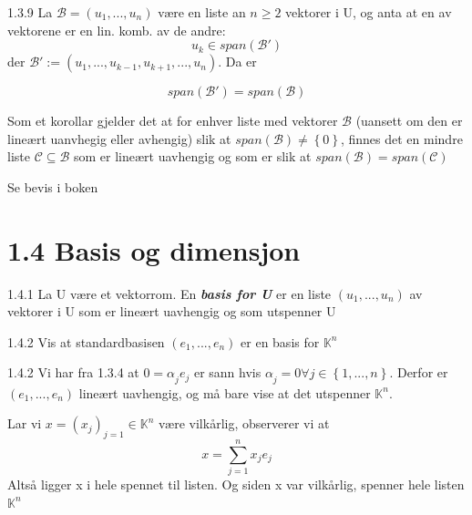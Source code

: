 \documentclass[a4paper,norsk]{article}
\renewcommand{\geq}{\geqslant}
\begin{document}
\begin{propositionbox}{1.3.9}{}
La $ \mathcal{B}= \left( u_1, ..., u_n \right)  $ være en liste an $  n \geq 2 $ vektorer i U, og anta at en av vektorene er en lin. komb. av de andre: 
\[
    u_k \in span \left( \mathcal{B}' \right) 
\]
der $ \mathcal{B}' := \left( u_1, ..., u_{k-1}, u_{k+1}, ..., u_n \right)  $. Da er

\[
    span \left( \mathcal{B}' \right) = span \left( \mathcal{B} \right) 
\]

Som et korollar gjelder det at for enhver liste med vektorer $ \mathcal{B} $  (uansett om den er lineært uanvhegig eller avhengig) slik at $ span \left( \mathcal{B} \right) \neq \left\{ 0 \right\}   $, finnes det en mindre liste $ \mathcal{C} \subseteq \mathcal{B} $ som er lineært uavhengig og som er slik at $ span \left( \mathcal{B} \right) = span \left( \mathcal{C} \right)   $ 

Se bevis i boken
\end{propositionbox}

\section*{1.4 Basis og dimensjon}

\begin{definitionbox}{1.4.1}{}
La U være et vektorrom. En \textbf{\textit{basis for U}} er en liste $ \left(  u_1, ..., u_n  \right)  $  av vektorer i U som er lineært uavhengig og som utspenner U
\end{definitionbox}


\begin{oppgavebox}{1.4.2}{}
Vis at standardbasisen $ \left( e_1, ..., e_n \right)  $ er en basis for $ \mathbb{K}^n $ 

\begin{proofbox}{1.4.2}{}
Vi har fra 1.3.4 at $ 0 = \alpha_{j}^{} e_j $ er sann hvis $ \alpha_{j}^{} = 0 \forall j \in \left\{ 1, ..., n \right\}  $. Derfor er $ \left( e_1, ..., e_n \right)  $ lineært uavhengig, og må bare vise at det utspenner $ \mathbb{K}^n $. 

Lar vi $ x = \left( x_j \right)_{j=1} \in \mathbb{K}^n  $ være vilkårlig, observerer vi at 
\[
    x = \sum_{ j=1 }^{ n } x_j e_j
\]
Altså ligger x i hele spennet til listen. Og siden x var vilkårlig, spenner hele listen $ \mathbb{K}^n $ 
\end{proofbox}
\end{oppgavebox}
\end{document}
